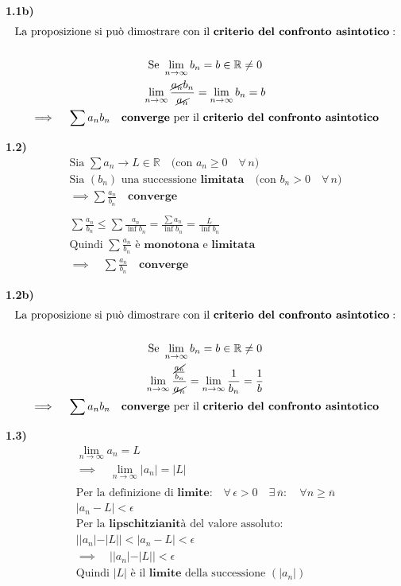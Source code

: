 \documentclass[11pt,reqno]{amsart}
\begin{document}
{\bf 1.1b)}
\begin{gather*}
 \text{La proposizione si può dimostrare con il } \textbf{criterio del confronto asintotico}:\\\\
 \text{Se } \lim_{n \to \infty} b_n = b \in \mathbb{R} \neq 0\\
 \lim_{n \to \infty} \frac{\cancel{a_n}b_n}{\cancel{a_n}} = \lim_{n \to \infty} b_n = b\\
 \implies \quad \sum a_nb_n \quad \textbf{converge} \text{ per il } \textbf{criterio del confronto asintotico}
\end{gather*}

{\bf 1.2)}
\begin{gather*}
 \text{Sia } \sum a_n \to L \in \mathbb{R} \quad \text{(con } a_n \geq 0 \quad \forall \, n \text{)}\\
 \text{Sia } (b_n) \text{ una successione } \textbf{limitata} \quad \text{(con } b_n > 0 \quad \forall \, n \text{)}\\
 \implies \sum \frac{a_n}{b_n} \quad \textbf{converge}\\\\
 \sum \frac{a_n}{b_n} \leq \sum \frac{a_n}{\inf b_n} = \frac{\sum a_n}{\inf b_n} = \frac{L}{\inf b_n}\\
 \text{Quindi } \sum \frac{a_n}{b_n} \text{ è } \textbf{monotona} \text{ e } \textbf{limitata}\\
 \implies \quad \sum \frac{a_n}{b_n} \quad \textbf{converge}
\end{gather*}

{\bf 1.2b)}
\begin{gather*}
 \text{La proposizione si può dimostrare con il } \textbf{criterio del confronto asintotico}:\\\\
 \text{Se } \lim_{n \to \infty} b_n = b \in \mathbb{R} \neq 0\\
 \lim_{n \to \infty} \frac{\frac{\cancel{a_n}}{b_n}}{\cancel{a_n}} = \lim_{n \to \infty} \frac{1}{b_n} = \frac{1}{b}\\
 \implies \quad \sum a_nb_n \quad \textbf{converge} \text{ per il } \textbf{criterio del confronto asintotico}\\
\end{gather*}

{\bf 1.3)}
\begin{gather*}
 \lim_{n \to \infty} a_n = L\\
 \implies \quad \lim_{n \to \infty} |a_n| = |L|\\\\
 \text{Per la definizione di } \textbf{limite} \text{:} \quad \forall \, \epsilon > 0 \quad \exists \, \overline{n}: \quad \forall n \geq \overline{n}\\
 |a_n - L| < \epsilon\\
 \text{Per la } \textbf{lipschitzianità} \text{ del valore assoluto:}\\
 ||a_n| - |L|| < |a_n - L| < \epsilon\\
 \implies \quad ||a_n| - |L|| < \epsilon\\
 \text{Quindi } |L| \text{ è il } \textbf{limite} \text{ della successione } (|a_n|)
\end{gather*}
\fi
\end{document}
